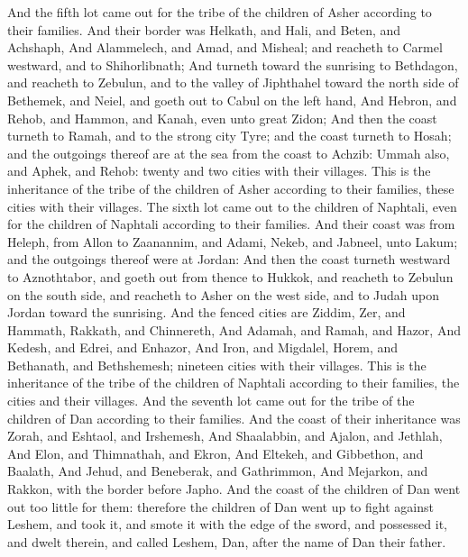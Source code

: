\begin{biblechapter}
 And the fifth lot came out for the tribe of the children of Asher according to their families.
\verse And their border was Helkath, and Hali, and Beten, and Achshaph,
\verse And Alammelech, and Amad, and Misheal; and reacheth to Carmel westward, and to Shihorlibnath;
\verse And turneth toward the sunrising to Bethdagon, and reacheth to Zebulun, and to the valley of Jiphthahel toward the north side of Bethemek, and Neiel, and goeth out to Cabul on the left hand,
\verse And Hebron, and Rehob, and Hammon, and Kanah, even unto great Zidon;
\verse And then the coast turneth to Ramah, and to the strong city Tyre; and the coast turneth to Hosah; and the outgoings thereof are at the sea from the coast to Achzib:
\verse Ummah also, and Aphek, and Rehob: twenty and two cities with their villages.
\verse This is the inheritance of the tribe of the children of Asher according to their families, these cities with their villages.
 The sixth lot came out to the children of Naphtali, even for the children of Naphtali according to their families.
\verse And their coast was from Heleph, from Allon to Zaanannim, and Adami, Nekeb, and Jabneel, unto Lakum; and the outgoings thereof were at Jordan:
\verse And then the coast turneth westward to Aznothtabor, and goeth out from thence to Hukkok, and reacheth to Zebulun on the south side, and reacheth to Asher on the west side, and to Judah upon Jordan toward the sunrising.
\verse And the fenced cities are Ziddim, Zer, and Hammath, Rakkath, and Chinnereth,
\verse And Adamah, and Ramah, and Hazor,
\verse And Kedesh, and Edrei, and Enhazor,
\verse And Iron, and Migdalel, Horem, and Bethanath, and Bethshemesh; nineteen cities with their villages.
\verse This is the inheritance of the tribe of the children of Naphtali according to their families, the cities and their villages.
 And the seventh lot came out for the tribe of the children of Dan according to their families.
\verse And the coast of their inheritance was Zorah, and Eshtaol, and Irshemesh,
\verse And Shaalabbin, and Ajalon, and Jethlah,
\verse And Elon, and Thimnathah, and Ekron,
\verse And Eltekeh, and Gibbethon, and Baalath,
\verse And Jehud, and Beneberak, and Gathrimmon,
\verse And Mejarkon, and Rakkon, with the border before Japho.
\verse And the coast of the children of Dan went out too little for them: therefore the children of Dan went up to fight against Leshem, and took it, and smote it with the edge of the sword, and possessed it, and dwelt therein, and called Leshem, Dan, after the name of Dan their father.

\end{biblechapter}
